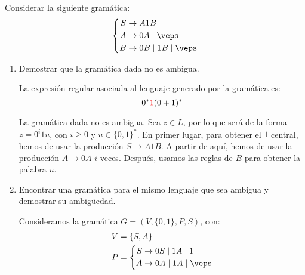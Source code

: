 \begin{ejercicio}\label{ej:1.4.9}
    Considerar la siguiente gramática:
    \begin{equation*}
        \left\{
            \begin{aligned}
                S &\rightarrow A 1 B\\
                A &\rightarrow 0A \mid \veps\\
                B &\rightarrow 0B \mid 1B \mid \veps
            \end{aligned}
        \right.
    \end{equation*}
    \begin{enumerate}
        \item Demostrar que la gramática dada no es ambigua.
        
        La expresión regular asociada al lenguaje generado por la gramática es:
        \begin{equation*}
            0^*{\color{red}1}(0+1)^*
        \end{equation*}

        La gramática dada no es ambigua. Sea $z\in L$, por lo que será de la forma $z=0^i1u$, con $i\geq 0$ y $u\in \{0,1\}^*$.
        En primer lugar, para obtener el $1$ central, hemos de usar la producción $S\rightarrow A1B$. A partir de aquí, hemos de usar la producción $A\rightarrow 0A$ $i$ veces. Después, usamos las reglas de $B$ para obtener la palabra $u$.

        \item Encontrar una gramática para el mismo lenguaje que sea ambigua y demostrar su ambigüedad.
        
        Consideramos la gramática $G=(V,\{0,1\},P,S)$, con:
        \begin{equation*}
            \begin{aligned}
                V &= \{ S, A \} \\
                P &= \left\{
                    \begin{aligned}
                        S &\rightarrow 0S\mid 1A\mid 1\\
                        A &\rightarrow 0A \mid 1A \mid \veps
                    \end{aligned}
                \right.
            \end{aligned}
        \end{equation*}


\end{enumerate}
\end{ejercicio}
